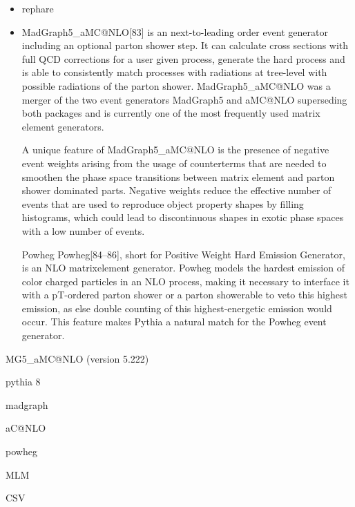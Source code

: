 \begin{itemize}


\item rephare



  
\item MadGraph5\_aMC@NLO[83] is an next-to-leading order event generator including an optional parton shower step. It can calculate cross sections with full QCD corrections for a user given process, generate the hard process and is able to consistently match processes with radiations at tree-level with possible radiations of the parton shower. MadGraph5\_aMC@NLO was a merger of the two event generators MadGraph5 and aMC@NLO superseding both packages and is currently one of the most frequently used matrix element generators.
  
  A unique feature of MadGraph5\_aMC@NLO is the presence of negative event weights arising from the usage of counterterms that are needed to smoothen the phase space transitions between matrix element and parton shower dominated parts. Negative weights reduce the effective number of events that are used to reproduce object property shapes by filling histograms, which could lead to discontinuous shapes in exotic phase spaces with a low number of events.

Powheg Powheg[84–86], short for Positive Weight Hard Emission Generator, is an NLO matrixelement generator. Powheg models the hardest emission of color charged particles in an NLO process, making it necessary to interface it with a pT-ordered parton shower or a parton showerable to veto this highest emission, as else double counting of this highest-energetic emission would occur. This feature makes Pythia a natural match for the Powheg event generator.

\end{itemize}


MG5\_aMC@NLO (version 5.222)

pythia 8

madgraph

aC@NLO

powheg

MLM

CSV





